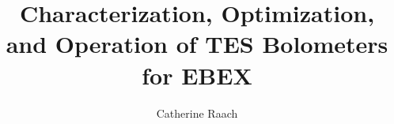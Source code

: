 \phd %

\title{\bf Characterization, Optimization, and Operation of TES Bolometers for EBEX}
\author{Catherine Raach}


\abstract{}
\copyrightpage %
\acknowledgements{}
\dedication{}


\beforepreface 

\figurespage
\tablespage

\afterpreface            
